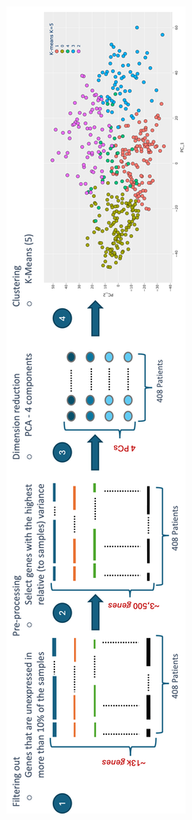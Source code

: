 
\begin{figure}[H]
    \centering
    \begin{minipage}[b]{0.75\textwidth}
        \centering
    \includegraphics[height=\textheight,keepaspectratio]{Sections/ClusteringAnalysis/Resources/clustering_pipeline.png}

\end{minipage}
\end{figure}

